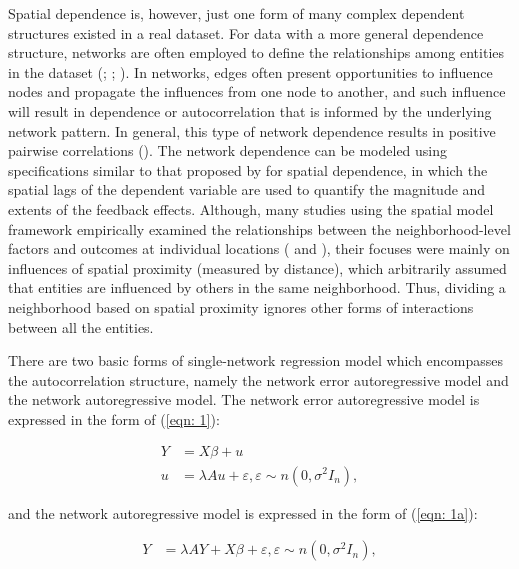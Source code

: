 \documentclass[times, doublespace]{auth}
\begin{document}
Spatial dependence is, however, just one form of many complex dependent structures existed in a real dataset. For data with a more general dependence structure, networks are often employed to define the relationships among entities in the dataset (\cite{R9}; \cite{R10}; \cite{R11}). In networks, edges often present opportunities to influence nodes and propagate the influences from one node to another, and such influence will result in dependence or autocorrelation that is informed by the underlying network pattern. In general, this type of network dependence results in positive pairwise correlations (\cite{R33}). The network dependence can be modeled using specifications similar to that proposed by \cite{R34} for spatial dependence, in which the spatial lags of the dependent variable are used to quantify the magnitude and extents of the feedback effects. Although, many studies using the spatial model framework empirically examined the relationships between the neighborhood-level factors and outcomes at individual locations (\cite{R35} and \cite{R28}), their focuses were mainly on influences of spatial proximity (measured by distance), which arbitrarily assumed that entities are influenced by others in the same neighborhood. Thus, dividing a neighborhood based on spatial proximity ignores other forms of interactions between all the entities. 
\newline

There are two basic forms of single-network regression model which encompasses the autocorrelation structure, namely the network error autoregressive model and the network autoregressive model. The network error autoregressive model is expressed in the form of (\ref{eqn: 1}):

\begin{equation}
\label{eqn: 1}
\begin{array}{rl}
Y &= X\beta + u\\
u &= \lambda Au + \varepsilon, \varepsilon \sim n(0, \sigma^{2}I_{n}),
\end{array}
\end{equation}

\noindent and the network autoregressive model is expressed in the form of (\ref{eqn: 1a}):

\begin{equation}
\label{eqn: 1a}
\begin{array}{rl}
Y &= \lambda AY + X\beta + \varepsilon, \varepsilon \sim n(0, \sigma^{2}I_{n}),
\end{array}
\end{equation}
\end{document}
